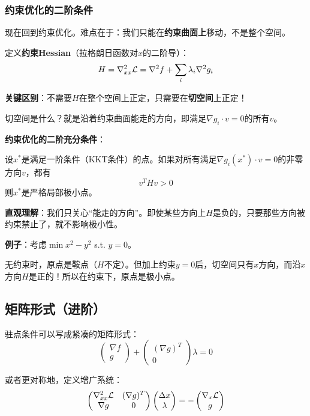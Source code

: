 
\subsubsection{约束优化的二阶条件}

现在回到约束优化。难点在于：我们只能在\textbf{约束曲面上}移动，不是整个空间。

定义\textbf{约束Hessian}（拉格朗日函数对$x$的二阶导）：
\[
H = \nabla^2_{xx} \mathcal{L} = \nabla^2 f + \sum_i \lambda_i \nabla^2 g_i
\]

\textbf{关键区别}：不需要$H$在整个空间上正定，只需要在\textbf{切空间}上正定！

切空间是什么？就是沿着约束曲面能走的方向，即满足$\nabla g_i \cdot v = 0$的所有$v$。

\begin{physicalmeaning}
\textbf{约束优化的二阶充分条件}：

设$x^*$是满足一阶条件（KKT条件）的点。如果对所有满足$\nabla g_i(x^*) \cdot v = 0$的非零方向$v$，都有
\[
v^T H v > 0
\]
则$x^*$是严格局部极小点。
\end{physicalmeaning}

\textbf{直观理解}：我们只关心“能走的方向”。即使某些方向上$H$是负的，只要那些方向被约束禁止了，就不影响极小性。

\textbf{例子}：考虑$\min x^2 - y^2$ s.t. $y = 0$。

无约束时，原点是鞍点（$H$不定）。但加上约束$y=0$后，切空间只有$x$方向，而沿$x$方向$H$是正的！所以在约束下，原点是极小点。



\subsection{矩阵形式（进阶）}

驻点条件可以写成紧凑的矩阵形式：
\[
\begin{pmatrix} \nabla f \\ g \end{pmatrix} + \begin{pmatrix} (\nabla g)^T \\ 0 \end{pmatrix} \lambda = 0
\]

或者更对称地，定义增广系统：
\[
\begin{pmatrix} \nabla^2_{xx}\mathcal{L} & (\nabla g)^T \\ \nabla g & 0 \end{pmatrix} \begin{pmatrix} \Delta x \\ \lambda \end{pmatrix} = -\begin{pmatrix} \nabla_x \mathcal{L} \\ g \end{pmatrix}
\]

